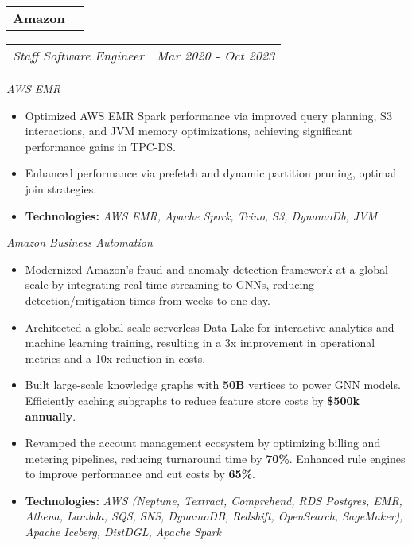 \documentclass[a4paper,11pt]{article}
\makeatletter
\newcommand{\resitem}[1]{\item #1}
\newcommand{\resCompany}[1]{
    \begin{tabular*}{\textwidth}{l @{\extracolsep{\fill}} r}
    \large \textbf{#1}
  \end{tabular*}
}
\newcommand{\resPosition}[2]{
    \begin{tabular*}{\textwidth}{l @{\extracolsep{\fill}} r}
        \textit{#1} & \textit{#2}
    \end{tabular*}
}
\makeatother
\begin{document}
    \indent \resCompany{Amazon}
        \indent \resPosition{Staff Software Engineer}{Mar 2020 - Oct 2023}
        \indent \textit{AWS EMR}
        \begin{itemize}[leftmargin=30pt, rightmargin=-16pt, itemsep=-2pt]
            \setlength{\itemsep}{-3pt}
            
            \resitem{Optimized AWS EMR Spark performance via improved query planning, S3 interactions, and JVM memory optimizations, achieving significant performance gains in TPC-DS.}
            
            \resitem{Enhanced performance via prefetch and dynamic partition pruning, optimal join strategies.}

            \resitem{\textbf{Technologies:} \textit{AWS EMR, Apache Spark, Trino, S3, DynamoDb, JVM}}
            
        \end{itemize}

        \indent \textit{Amazon Business Automation}
        \begin{itemize}[leftmargin=30pt, rightmargin=-16pt, itemsep=-2pt]
            \setlength{\itemsep}{-3pt}
            
            \resitem{Modernized Amazon's fraud and anomaly detection framework at a global scale by integrating real-time streaming to GNNs, reducing detection/mitigation times from weeks to one day.}
            
            \resitem{Architected a global scale serverless Data Lake for interactive analytics and machine learning training, resulting in a 3x improvement in operational metrics and a 10x reduction in costs.}
            
            \resitem{Built large-scale knowledge graphs with \textbf{50B} vertices to power GNN models. Efficiently caching subgraphs to reduce feature store costs by \textbf{\$500k annually}.}

            \resitem{Revamped the account management ecosystem by optimizing billing and metering pipelines, reducing turnaround time by \textbf{70\%}. Enhanced rule engines to improve performance and cut costs by \textbf{65\%}.}

            \resitem{\textbf{Technologies:} \textit{AWS (Neptune, Textract, Comprehend, RDS Postgres, EMR, Athena, Lambda, SQS, SNS, DynamoDB, Redshift, OpenSearch, SageMaker), 
            Apache Iceberg, DistDGL, Apache Spark}}
            
        \end{itemize}
\end{document}
